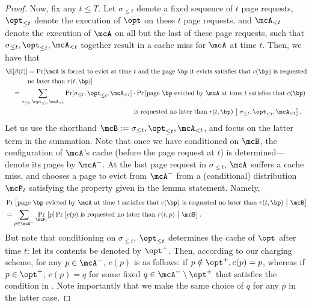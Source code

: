 \begin{proof}
    Now, fix any $t \le T$. Let $\sigma_{\le t}$ denote a fixed sequence of $t$ page requests, $\opt_{\le t}$ denote the execution of $\opt$ on these $t$ page requests, and $\mcA_{<t}$ denote the execution of $\mcA$ on all but the last of these page requests, such that $\sigma_{\le t}, \opt_{\le t}, \mcA_{< t}$ together result in a cache miss for $\mcA$ at time $t$. Then, we have that
    \begin{align*}
        \E[\beta(t)] &= \Pr[\text{$\mcA$ is forced to evict at time $t$ and the page $\bp$ it evicts satisfies that $c(\bp)$ is requested} \nonumber \\
        &\text{no later than $r(t,\bp)$}] \\
        &\hspace{-0.8cm}= \sum_{\sigma_{\le t}, \opt_{\le t}, \mcA_{<t}} \Pr[\sigma_{\le t}, \opt_{\le t}, \mcA_{<t}] \cdot \Pr\left[\text{page $\bp$ evicted by $\mcA$ at time $t$ satisfies that $c(\bp)$} \right. \\ &\qquad\qquad\qquad\qquad\qquad\qquad\qquad\qquad
        \left.\text{is requested no later than $r(t,\bp)$}\ \big|\ \sigma_{\le t}, \opt_{\le t}, \mcA_{<t}\right],
    \end{align*}
    Let us use the shorthand $\mcB:=\sigma_{\le t}, \opt_{\le t}, \mcA_{<t}$, and focus on the latter term in the summation.
    Note that once we have conditioned on $\mcB$, the configuration of $\mcA$'s cache (before the page request at $t$) is determined---denote its pages by $\mcA^-$.  At the last page request in $\sigma_{\le t}$, $\mcA$ suffers a cache miss, and chooses a page to evict from $\mcA^-$ from a (conditional) distribution $\mcP_t$ satisfying the property given in the lemma statement. Namely,
    \begin{align*}
        &\Pr\left[\text{page $\bp$ evicted by $\mcA$ at time $t$ satisfies that $c(\bp)$ is requested no later than $r(t,\bp)$}\ \big|\ \mcB\right] \\
        &= \sum_{p \in \mcA^-}\Pr_{\mcP_t}[p] \Pr\left[\text{$c(p)$ is requested no later than $r(t,p)$}\ \big|\ \mcB\right].
    \end{align*}
    But note that conditioning on $\sigma_{\le t}$, $\opt_{\le t}$ determines the cache of $\opt$ after time $t$: let its contents be denoted by $\opt^+$. Then, according to our charging scheme, for any $p \in \mcA^-$, $c(p)$ is as follows: if $p \notin \opt^+, c(p)=p$, whereas if $p \in \opt^+$, $c(p)=q$ for some fixed $q \in \mcA^-\setminus \opt^+$ that satisfies the condition in . Note importantly that we make the same choice of $q$ for any $p$ in the latter case.

\end{proof}
